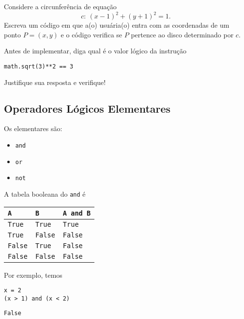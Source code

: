 \documentclass[a4paper,10pt,twoside]{article}
\begin{document}
\begin{exr}
  Considere a circunferência de equação
  \begin{equation}
    c: ~(x - 1)^2 + (y + 1)^2 = 1.
  \end{equation}
  Escreva um código em que a(o) usuária(o) entra com as coordenadas de um ponto $P = (x, y)$ e o código verifica se $P$ pertence ao disco determinado por $c$.
\end{exr}

\begin{exr}
  Antes de implementar, diga qual é o valor lógico da instrução

\begin{lstlisting}
math.sqrt(3)**2 == 3
\end{lstlisting}

Justifique sua resposta e verifique!
\end{exr}

\subsection{Operadores Lógicos Elementares}

Os  elementares são:
\begin{itemize}
\item[]\texttt{and} 
\item[]\texttt{or} 
\item[]\texttt{not} 
\end{itemize}

\begin{ex}
  A tabela booleana{\boole} do \texttt{and} é
  \begin{center}
    \begin{tabular}[H]{ll|l}
      \texttt{A} & \texttt{B} & \texttt{A and B}\\\hline
      \texttt{True} & \texttt{True} & \texttt{True} \\
      \texttt{True} & \texttt{False} & \texttt{False} \\
      \texttt{False} & \texttt{True} & \texttt{False} \\
      \texttt{False} & \texttt{False} & \texttt{False} \\\hline
    \end{tabular}
  \end{center}

  Por exemplo, temos

\begin{lstlisting}
x = 2
(x > 1) and (x < 2)
\end{lstlisting}

\begin{verbatim}
False
\end{verbatim}

\end{ex}
\end{document}
